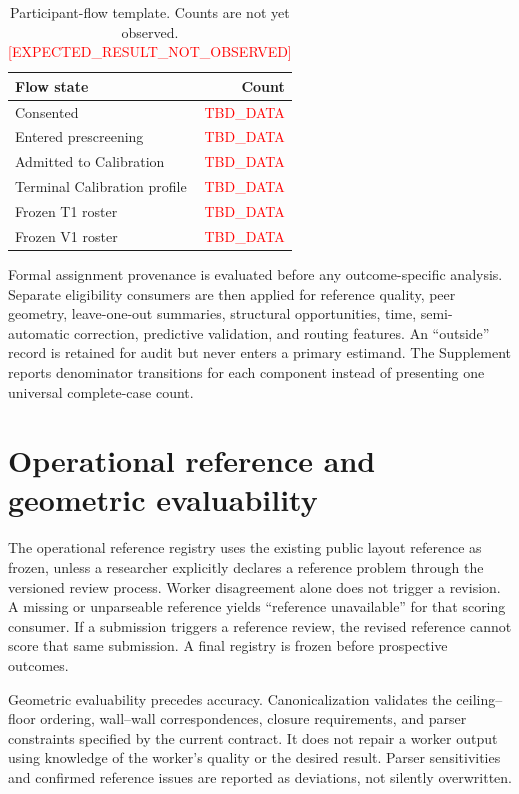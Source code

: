 \documentclass[preprint,12pt]{elsarticle}
\newcommand{\expectedresult}{\textcolor{red}{[EXPECTED\_RESULT\_NOT\_OBSERVED]}}
\newcommand{\tbddata}{\textcolor{red}{TBD\_DATA}}
\begin{document}
\begin{table}[h]
\centering
\caption{Participant-flow template. Counts are not yet observed. \expectedresult{}}
\label{tab:supflow}
\begin{tabular}{lr}
\toprule
Flow state & Count \\
\midrule
Consented & \tbddata{} \\
Entered prescreening & \tbddata{} \\
Admitted to Calibration & \tbddata{} \\
Terminal Calibration profile & \tbddata{} \\
Frozen T1 roster & \tbddata{} \\
Frozen V1 roster & \tbddata{} \\
\bottomrule
\end{tabular}
\end{table}

Formal assignment provenance is evaluated before any outcome-specific analysis. Separate eligibility consumers are then applied for reference quality, peer geometry, leave-one-out summaries, structural opportunities, time, semi-automatic correction, predictive validation, and routing features. An ``outside'' record is retained for audit but never enters a primary estimand. The Supplement reports denominator transitions for each component instead of presenting one universal complete-case count.

\section{Operational reference and geometric evaluability}
\label{sup:reference}

The operational reference registry uses the existing public layout reference as frozen, unless a researcher explicitly declares a reference problem through the versioned review process. Worker disagreement alone does not trigger a revision. A missing or unparseable reference yields ``reference unavailable'' for that scoring consumer. If a submission triggers a reference review, the revised reference cannot score that same submission. A final registry is frozen before prospective outcomes.

Geometric evaluability precedes accuracy. Canonicalization validates the ceiling--floor ordering, wall--wall correspondences, closure requirements, and parser constraints specified by the current contract. It does not repair a worker output using knowledge of the worker's quality or the desired result. Parser sensitivities and confirmed reference issues are reported as deviations, not silently overwritten.
\end{document}
